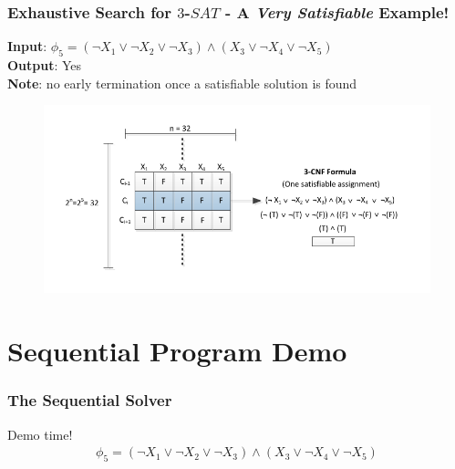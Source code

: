 \documentclass[handout]{beamer}
\begin{document}
\begin{frame}
	\frametitle{Exhaustive Search for $3$-$SAT$ - A \emph{Very Satisfiable} Example!}
\textbf{Input}: $\phi_5 = (\lnot X_1 \lor \lnot X_2 \lor \lnot X_3) \land (X_3 \lor \lnot X_4 \lor \lnot X_5)$ \\
\textbf{Output}: Yes \\ 
\textbf{Note}: no early termination once a satisfiable solution is found
\begin{figure}
\centering
\includegraphics[scale = 0.8]{satSolverAlg.pdf}
\end{figure}
\end{frame}

\section{Sequential Program Demo}
\begin{frame}
	\frametitle{The Sequential Solver}
	\begin{center}
		Demo time!
		\begin{align*}
			\phi_5 = (\lnot X_1 \lor \lnot X_2 \lor \lnot X_3) \land (X_3 \lor \lnot X_4 \lor \lnot X_5)
		\end{align*}
	\end{center}
\end{frame}

%	
%	

\end{document}
